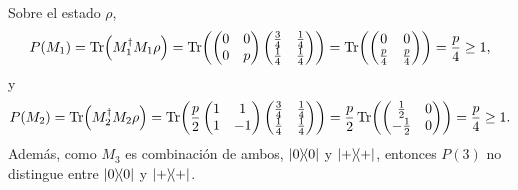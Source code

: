 \documentclass{scrartcl}
\newcommand{\inv}[1]{\frac{1}{#1}}
\DeclareRobustCommand{\[}{\begin{equation}}
\DeclareRobustCommand{\]}{\end{equation}}
\begin{document}
\begin{enumerate}
    Sobre el estado $\rho$,
    \[
        P(M_1) = \Tr(M_1^\dagger M_1 \rho) =
        \Tr(\begin{pmatrix}
            0 & 0 \\
            0 & p
        \end{pmatrix}
        \begin{pmatrix}
            \frac{3}{4} & \inv{4} \\
            \inv{4} & \inv{4}
        \end{pmatrix})
        =
        \Tr(\begin{pmatrix}
            0 & 0 \\
            \frac{p}{4} & \frac{p}{4}
        \end{pmatrix})
        = \frac{p}{4} \geq 1,
    \]
    y
    \[
        P(M_2) = \Tr(M_2^\dagger M_2 \rho) =
        \Tr(\frac{p}{2} \begin{pmatrix}
            1 & 1 \\
            1 & -1
        \end{pmatrix}
        \begin{pmatrix}
            \frac{3}{4} & \inv{4} \\
            \inv{4} & \inv{4}
        \end{pmatrix})
        =
        \frac{p}{2}
        \Tr(\begin{pmatrix}
            \frac{1}{2} & 0 \\
            -\frac{1}{2} & 0
        \end{pmatrix})
        = \frac{p}{4} \geq 1.
    \]
    Además, como $M_3$ es combinación de ambos, $\dyad{0}{0}$ y $\dyad{+}{+}$, entonces $P(3)$ no distingue entre $\dyad{0}{0}$ y $\dyad{+}{+}$.
    
\end{enumerate}
\end{document}
